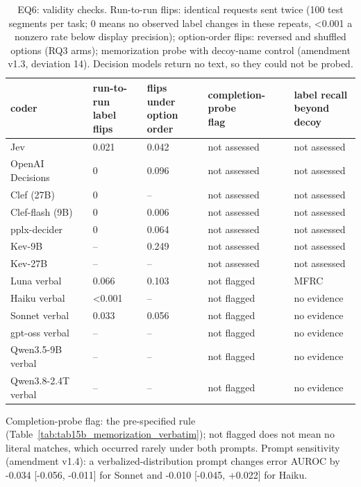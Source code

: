 \begin{table}[t]
\centering
\small
\caption{EQ6: validity checks. Run-to-run flips: identical requests sent twice (100 test segments per task; 0 means no observed label changes in these repeats, <0.001 a nonzero rate below display precision); option-order flips: reversed and shuffled options (RQ3 arms); memorization probe with decoy-name control (amendment v1.3, deviation 14). Decision models return no text, so they could not be probed.}
\label{tab:main_validity}
\begin{adjustbox}{max width=\linewidth}
\begin{tabular}{lllll}
\toprule
coder & \makecell[bl]{run-to-run \\{} label flips} & \makecell[bl]{flips under \\{} option order} & \makecell[bl]{completion-probe \\{} flag} & \makecell[bl]{label recall \\{} beyond decoy} \\
\midrule
Jev & 0.021 & 0.042 & not assessed & not assessed \\
OpenAI Decisions & 0 & 0.096 & not assessed & not assessed \\
Clef (27B) & 0 & -- & not assessed & not assessed \\
Clef-flash (9B) & 0 & 0.006 & not assessed & not assessed \\
pplx-decider & 0 & 0.064 & not assessed & not assessed \\
Kev-9B & -- & 0.249 & not assessed & not assessed \\
Kev-27B & -- & -- & not assessed & not assessed \\
Luna verbal & 0.066 & 0.103 & not flagged & MFRC \\
Haiku verbal & <0.001 & -- & not flagged & no evidence \\
Sonnet verbal & 0.033 & 0.056 & not flagged & no evidence \\
gpt-oss verbal & -- & -- & not flagged & no evidence \\
Qwen3.5-9B verbal & -- & -- & not flagged & no evidence \\
Qwen3.8-2.4T verbal & -- & -- & not flagged & no evidence \\
\bottomrule
\end{tabular}
\end{adjustbox}
\par\smallskip\footnotesize\raggedright Completion-probe flag: the pre-specified rule (Table~\ref{tab:tab15b_memorization_verbatim}); not flagged does not mean no literal matches, which occurred rarely under both prompts. Prompt sensitivity (amendment v1.4): a verbalized-distribution prompt changes error AUROC by -0.034 [-0.056, -0.011] for Sonnet and -0.010 [-0.045, +0.022] for Haiku.
\end{table}
